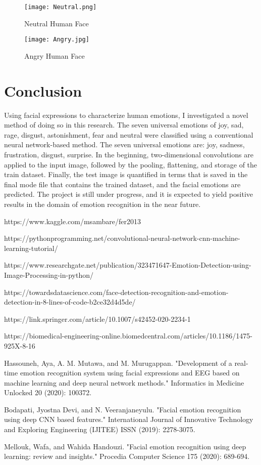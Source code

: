 \documentclass{ieeeaccess}
\begin{document}
\begin{figure}[h]
\centering
\texttt{[image: Neutral.png]}
\caption{Neutral Human Face}
\end{figure}

\begin{figure}[h]
\centering
\texttt{[image: Angry.jpg]}
\caption{Angry Human Face}
\end{figure}

\section{Conclusion}
Using facial expressions to characterize human emotions, I investigated a novel method of doing so in this research. The seven universal emotions of joy, sad, rage, disgust, astonishment, fear and neutral were classified using a conventional neural network-based method. The seven universal emotions are: joy, sadness, frustration, disgust, surprise.
In the beginning, two-dimensional convolutions are applied to the input image, followed by the pooling, flattening, and storage of the train dataset. Finally, the test image is quantified in terms that is saved in the final mode file that contains the trained dataset, and the facial emotions are predicted.
The project is still under progress, and it is expected to yield positive results in the domain of emotion recognition in the near future.

\newpage
\begin{thebibliography}{00}

 https://www.kaggle.com/msambare/fer2013

 https://pythonprogramming.net/convolutional-neural-network-cnn-machine-learning-tutorial/

 https://www.researchgate.net/publication/323471647-Emotion-Detection-using-Image-Processing-in-python/

 https://towardsdatascience.com/face-detection-recognition-and-emotion-detection-in-8-lines-of-code-b2ce32d4d5de/

 https://link.springer.com/article/10.1007/s42452-020-2234-1

 https://biomedical-engineering-online.biomedcentral.com/articles/10.1186/1475-925X-8-16 

 Hassouneh, Aya, A. M. Mutawa, and M. Murugappan. "Development of a real-time emotion recognition system using facial expressions and EEG based on machine learning and deep neural network methods." Informatics in Medicine Unlocked 20 (2020): 100372.

 Bodapati, Jyostna Devi, and N. Veeranjaneyulu. "Facial emotion recognition using deep CNN based features." International Journal of Innovative Technology and Exploring Engineering (IJITEE) ISSN (2019): 2278-3075.

 Mellouk, Wafa, and Wahida Handouzi. "Facial emotion recognition using deep learning: review and insights." Procedia Computer Science 175 (2020): 689-694.
\end{thebibliography}
\EOD
\end{document}
